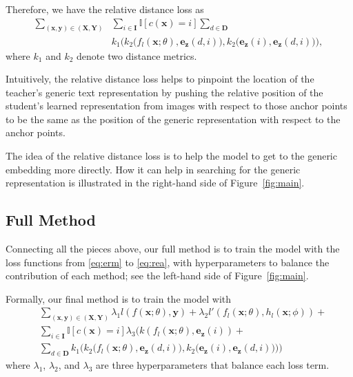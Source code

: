 \documentclass[10pt,twocolumn,letterpaper]{article}
\newcommand{\X}{\mathbf{X}}
\newcommand{\Y}{\mathbf{Y}}
\newcommand{\x}{\mathbf{x}}
\newcommand{\y}{\mathbf{y}}
\newcommand{\z}{\mathbf{z}}
\begin{document}
Therefore, we have the relative distance loss as 
\begin{equation}
\begin{aligned}
    \sum_{(\x,\y)\in(\X,\Y)}&\sum_{i\in\mathbf{I}} \mathbb{I}[c(\x)=i]\sum_{d\in\mathbf{D}}\\
    &k_1\Big(k_2\big(f_l(\x;\theta), \mathbf{e}_\z(d, i)\big),
    k_2\big(\mathbf{e_\z}(i), \mathbf{e}_\z(d, i)\big)\Big), 
    \label{eq:rea}
\end{aligned}
\end{equation}
where $k_1$ and $k_2$ denote two distance metrics. 

Intuitively, the relative distance loss helps to pinpoint the location 
of the teacher's generic text representation by pushing the relative position 
of the student's learned representation from images with respect to those anchor points to be the same as the position of the generic representation with respect to the anchor points. 

The idea of the relative distance loss is to help the model to get to the generic embedding more directly. 
How it can help in searching for the generic representation is illustrated in the right-hand side of Figure~\ref{fig:main}. 






\subsection{Full Method}

Connecting all the pieces above, our full method is to 
train the model with the loss functions from 
\eqref{eq:erm} to \eqref{eq:rea}, 
with hyperparameters to balance the contribution of each method; see the left-hand side of Figure~\ref{fig:main}.  

Formally, our final method is to train the model 
with 
\begin{align*}
    &\sum_{(\x,\y)\in(\X,\Y)} \lambda_1 l(f(\x;\theta), \y) 
    + \lambda_2 l'(f_l(\x;\theta), h_l(\x;\phi)) + \\
    & \sum_{i\in\mathbf{I}}\mathbb{I}[c(\x)=i]
    \lambda_3 \bigg(
     k(f_l(\x;\theta), \mathbf{e_\z}(i)) + \\
    & 
     \sum_{d\in\mathbf{D}}
    k_1\Big(k_2\big(f_l(\x;\theta), \mathbf{e}_\z(d, i)\big),
    k_2\big(\mathbf{e_\z}(i), \mathbf{e}_\z(d, i)\big)\Big)
    \bigg)
\end{align*}
where $\lambda_1$, $\lambda_2$, and $\lambda_3$
are three hyperparameters that balance each loss term. 
\end{document}
